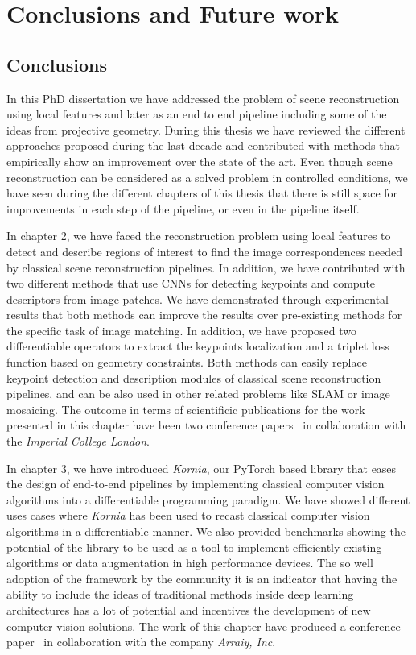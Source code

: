 \chapter{Conclusions and Future work}
\label{chap:end}

\section{Conclusions}

In this PhD dissertation we have addressed the problem of scene reconstruction using local features and later as an end to end pipeline including some of the ideas from projective geometry. During this thesis we have reviewed the different approaches proposed during the last decade and contributed with methods that empirically show an improvement over the state of the art. Even though scene reconstruction can be considered as a solved problem in controlled conditions, we have seen during the different chapters of this thesis that there is still space for improvements in each step of the pipeline, or even in the pipeline itself.

In chapter 2, we have faced the reconstruction problem using local features to detect and describe regions of interest to find the image correspondences needed by classical scene reconstruction pipelines. In addition, we have contributed with two different methods that use CNNs for detecting keypoints and compute descriptors from image patches. We have demonstrated through experimental results that both methods can improve the results over pre-existing methods for the specific task of image matching. In addition, we have proposed two differentiable operators to extract the keypoints localization and a triplet loss function based on geometry constraints. Both methods can easily replace keypoint detection and description modules of classical scene reconstruction pipelines, and can be also used in other related problems like SLAM or image mosaicing. The outcome in terms of scientificic publications for the work presented in this chapter have been two conference papers~\cite{barroso2019keynet, BalntasBMVC2016} in collaboration with the \textit{Imperial College London}.

In chapter 3, we have introduced \textit{Kornia}, our PyTorch based library that eases the design of end-to-end pipelines by implementing classical computer vision algorithms into a differentiable programming paradigm. We have showed different uses cases where \textit{Kornia} has been used to recast classical computer vision algorithms in a differentiable manner. We also provided benchmarks showing the potential of the library to be used as a tool to implement efficiently existing algorithms or data augmentation in high performance devices. The so well adoption of the framework by the community it is an indicator that having the ability to include the ideas of traditional methods inside deep learning architectures has a lot of potential and incentives the development of new computer vision solutions. The work of this chapter have produced a conference paper~\cite{eriba2019kornia} in collaboration with the company \textit{Arraiy, Inc}.

